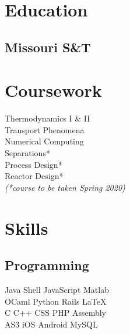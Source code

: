 \documentclass[]{deedy-resume-openfont}
\begin{document}
%
%
\lastupdated

%
%



%
%

\begin{minipage}[t]{0.33\textwidth} 


\section{Education} 
\subsection{Missouri S\&T}

\sectionsep


\section{Coursework}
Thermodynamics I \& II \\
Transport Phenomena \\
Numerical Computing \\
Separations* \\
Process Design* \\
Reactor Design* \\
{\footnotesize \textit{{(*course to be taken Spring 2020) }}} \\
\sectionsep


\section{Skills}
\subsection{Programming}
Java \textbullet{}   Shell \textbullet{} JavaScript \textbullet{} Matlab \\
OCaml \textbullet{} Python \textbullet{} Rails \textbullet{} \LaTeX\ \\ 
C \textbullet{} C++ \textbullet{} CSS \textbullet{} PHP \textbullet{} Assembly \\
AS3 \textbullet{} iOS \textbullet{} Android \textbullet{} MySQL
\sectionsep


\end{minipage}
\end{document}
